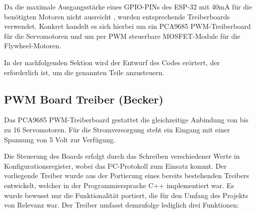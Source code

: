 Da die maximale Ausgangsstärke eines GPIO-PINs des ESP-32 mit 40mA \cite[S.~53]{esp_datasheet} für die benötigten Motoren nicht ausreicht \cite{esp_platform_flywheel_motor,esp_platform_small_servo,esp_platform_servo}, wurden entsprechende Treiberboards verwendet.
Konkret handelt es sich hierbei um ein PCA9685 PWM-Treiberboard für die Servomotoren und um per PWM steuerbare MOSFET-Module für die Flywheel-Motoren.

In der nachfolgenden Sektion wird der Entwurf des Codes erörtert, der erforderlich ist, um die genannten Teile anzusteuern.

\subsection{PWM Board Treiber (Becker)}

Das PCA9685 PWM-Treiberboard gestattet die gleichzeitige Anbindung von bis zu 16 Servomotoren.
Für die Stromversorgung steht ein Eingang mit einer Spannung von 5 Volt zur Verfügung.

Die Steuerung des Boards erfolgt durch das Schreiben verschiedener Werte in Konfigurationsregister, wobei das I²C-Protokoll zum Einsatz kommt. 
Der vorliegende Treiber wurde aus der Portierung eines bereits bestehenden Treibers \cite{esp_pca9685_blueprint} entwickelt, welcher in der Programmiersprache C++ implementiert war. 
Es wurde bewusst nur die Funktionalität portiert, die für den Umfang des Projekts von Relevanz war. 
Der Treiber umfasst demzufolge lediglich drei Funktionen:

